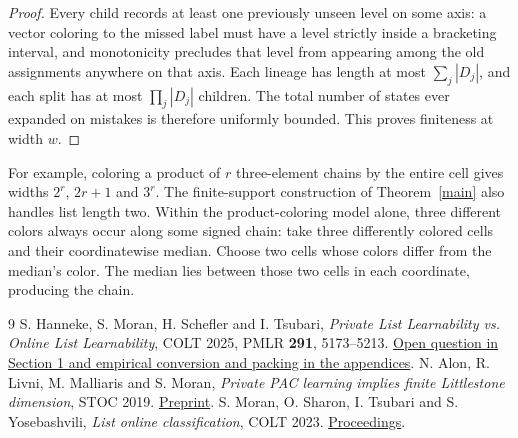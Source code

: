 \documentclass[11pt]{article}
\begin{document}
\begin{proof}
Every child records at least one previously unseen level on some axis: a vector coloring to the missed label must have a level strictly inside a bracketing interval, and monotonicity precludes that level from appearing among the old assignments anywhere on that axis. Each lineage has length at most $\sum_j |D_j|$, and each split has at most $\prod_j |D_j|$ children. The total number of states ever expanded on mistakes is therefore uniformly bounded. This proves finiteness at width $w$.
\end{proof}

For example, coloring a product of $r$ three-element chains by the entire cell gives widths $2^r$, $2r+1$ and $3^r$. The finite-support construction of Theorem~\ref{main} also handles list length two. Within the product-coloring model alone, three different colors always occur along some signed chain: take three differently colored cells and their coordinatewise median. Choose two cells whose colors differ from the median's color. The median lies between those two cells in each coordinate, producing the chain.

\begin{thebibliography}{9}
 S. Hanneke, S. Moran, H. Schefler and I. Tsubari, \emph{Private List Learnability vs. Online List Learnability}, COLT 2025, PMLR \textbf{291}, 5173--5213. \href{https://proceedings.mlr.press/v291/hanneke25d.html}{Open question in Section 1 and empirical conversion and packing in the appendices}.
 N. Alon, R. Livni, M. Malliaris and S. Moran, \emph{Private PAC learning implies finite Littlestone dimension}, STOC 2019. \href{https://arxiv.org/abs/1806.00949}{Preprint}.
 S. Moran, O. Sharon, I. Tsubari and S. Yosebashvili, \emph{List online classification}, COLT 2023. \href{https://proceedings.mlr.press/v195/moran23a.html}{Proceedings}.
\end{thebibliography}
\end{document}
